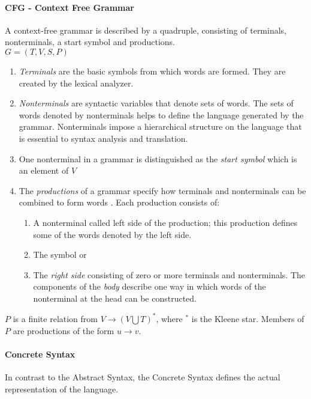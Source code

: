 \paragraph{CFG - Context Free Grammar }
A context-free grammar is described by a quadruple, consisting of terminals, nonterminals, a start symbol and productions.\\
$G = (T, V, S, P)$
\begin{enumerate}
	\item \emph{Terminals} are the basic symbols from which words are formed.  They are created by the lexical analyzer.
	\item \emph{Nonterminals} are syntactic variables that denote sets of words. The sets of words denoted by nonterminals helps to define the language generated by the grammar. Nonterminals impose a hierarchical structure on the language that is essential to syntax analysis and translation.
	\item One nonterminal in a grammar is distinguished as the \emph{start symbol} which is an element of $V$
	\item The \emph{productions} of a grammar specify how terminals and nonterminals can be combined to form words . Each production consists of:
	\begin{enumerate}
		\item A nonterminal called left side of the production; this production defines some of the words denoted by the left side.
		\item The symbol \code{$\rightarrow$}  or  \code{::=} 
		\item The \emph{right side} consisting of zero or more terminals and nonterminals. The components of the \emph{body} describe one way in which words of the nonterminal at the head can be constructed.
	\end{enumerate}
\end{enumerate}
 $P$ is a finite relation from $V \rightarrow (V  \bigcup  T)^*$, where $^*$ is the Kleene star. Members of $P$ are productions of the form $u \rightarrow v$. \cite{DragonBook}
 
\paragraph{Concrete Syntax} In contrast to the Abstract Syntax, the Concrete Syntax defines the actual representation of the language. \cite{MDSD}

